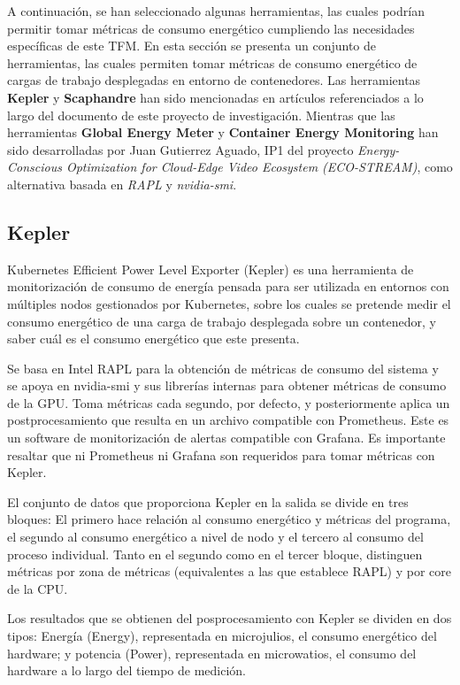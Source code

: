  A continuación, se han seleccionado algunas herramientas, las cuales podrían permitir tomar métricas de consumo energético cumpliendo las necesidades específicas de este TFM. En esta sección se presenta un conjunto de herramientas, las cuales permiten tomar métricas de consumo energético de cargas de trabajo desplegadas en entorno de contenedores. Las herramientas \textbf{Kepler} y \textbf{Scaphandre} han sido mencionadas en artículos referenciados a lo largo del documento de este proyecto de investigación. Mientras que las herramientas \textbf{Global Energy Meter} y \textbf{Container Energy Monitoring} han sido desarrolladas por Juan Gutierrez Aguado, IP1 del proyecto \textit{Energy-Conscious Optimization for Cloud-Edge Video Ecosystem (ECO-STREAM)}, como alternativa basada en \textit{RAPL} y \textit{nvidia-smi}.

\subsection*{Kepler}\label{arte-herr-kepler}
 Kubernetes Efficient Power Level Exporter (Kepler) es una herramienta de monitorización de consumo de energía pensada para ser utilizada en entornos con múltiples nodos gestionados por Kubernetes, sobre los cuales se pretende medir el consumo energético de una carga de trabajo desplegada sobre un contenedor, y saber cuál es el consumo energético que este presenta.

  Se basa en Intel RAPL para la obtención de métricas de consumo del sistema y se apoya en nvidia-smi y sus librerías internas para obtener métricas de consumo de la GPU. Toma métricas cada segundo, por defecto, y posteriormente aplica un postprocesamiento que resulta en un archivo compatible con Prometheus. Este es un software de monitorización de alertas compatible con Grafana. Es importante resaltar que ni Prometheus ni Grafana son requeridos para tomar métricas con Kepler.

  El conjunto de datos que proporciona Kepler en la salida se divide en tres bloques: El primero hace relación al consumo energético y métricas del programa, el segundo al consumo energético a nivel de nodo y el tercero al consumo del proceso individual. Tanto en el segundo como en el tercer bloque, distinguen métricas por zona de métricas (equivalentes a las que establece RAPL) y por core de la CPU.

  Los resultados que se obtienen del posprocesamiento con Kepler se dividen en dos tipos: Energía (Energy), representada en microjulios, el consumo energético del hardware; y potencia (Power), representada en microwatios, el consumo del hardware a lo largo del tiempo de medición. 

